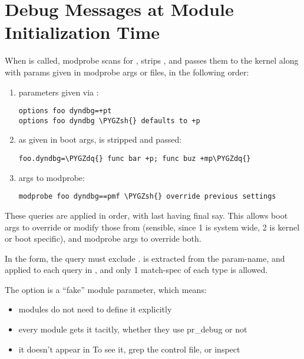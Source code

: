\documentclass[a4paper,8pt,english]{sphinxmanual}
\def\PYGZsh{\char`\#}
\def\PYGZdq{\char`\"}
\begin{document}
\section{Debug Messages at Module Initialization Time}
\label{admin-guide/dynamic-debug-howto:debug-messages-at-module-initialization-time}
When  is called, modprobe scans  for
, strips , and passes them to the kernel along with
params given in modprobe args or  files,
in the following order:
\begin{enumerate}
\item {} 
parameters given via :

\begin{Verbatim}[commandchars=\\\{\}]
options foo dyndbg=+pt
options foo dyndbg \PYGZsh{} defaults to +p
\end{Verbatim}

\item {} 
 as given in boot args,  is stripped and passed:

\begin{Verbatim}[commandchars=\\\{\}]
foo.dyndbg=\PYGZdq{} func bar +p; func buz +mp\PYGZdq{}
\end{Verbatim}

\item {} 
args to modprobe:

\begin{Verbatim}[commandchars=\\\{\}]
modprobe foo dyndbg==pmf \PYGZsh{} override previous settings
\end{Verbatim}

\end{enumerate}

These  queries are applied in order, with last having final say.
This allows boot args to override or modify those from 
(sensible, since 1 is system wide, 2 is kernel or boot specific), and
modprobe args to override both.

In the  form, the query must exclude .
 is extracted from the param-name, and applied to each query in
, and only 1 match-spec of each type is allowed.

The  option is a ``fake'' module parameter, which means:
\begin{itemize}
\item {} 
modules do not need to define it explicitly

\item {} 
every module gets it tacitly, whether they use pr\_debug or not

\item {} 
it doesn't appear in 
To see it, grep the control file, or inspect 

\end{itemize}
\end{document}
